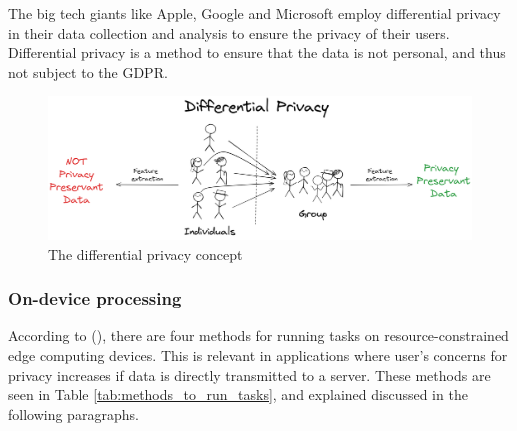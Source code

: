 The big tech giants like Apple, Google and Microsoft employ differential privacy in their data collection and analysis to ensure the privacy of their users. Differential privacy is a method to ensure that the data is not personal, and thus not subject to the GDPR.

\begin{figure}[H]
    \centering
    \includegraphics[width=\linewidth]{Images/Diagrams/differential-privacy.png}
    \caption{\centering The differential privacy concept}
    \label{fig:differential-privacy}
\end{figure}

\subsubsection{On-device processing}
According to \citeauthor{hu2022accurateobjectdetectionatedge} (\citeyear{hu2022accurateobjectdetectionatedge}), there are four methods for running tasks on resource-constrained edge computing devices. This is relevant in applications where user's concerns for privacy increases if data is directly transmitted to a server. These methods are seen in Table \ref{tab:methods_to_run_tasks}, and explained discussed in the following paragraphs.

